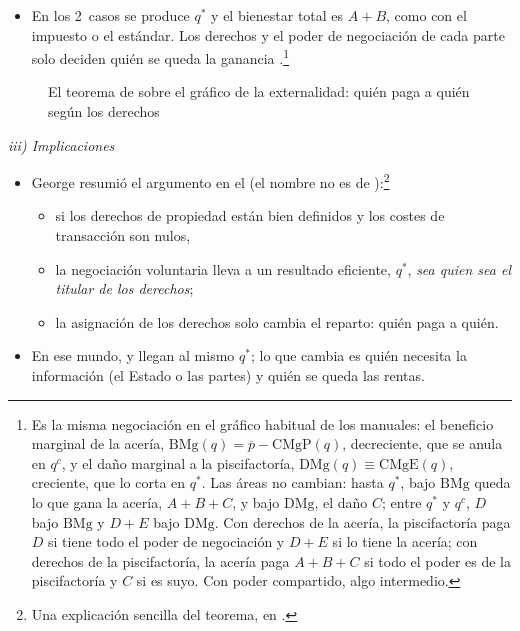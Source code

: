 \documentclass[11pt]{article}
\begin{document}
\begin{itemize}
  \begin{itemize}
  \item la acería gana $A+B+C$ y causa un daño $C$;
  \item el pago está entre $C$, lo mínimo que acepta la piscifactoría, y $A+B+C$, lo máximo que paga la acería.
  \end{itemize}
\item En los 2~casos se produce $q^*$ y el bienestar total es $A+B$, como con el impuesto o el estándar. Los derechos y el poder de negociación de cada parte solo deciden quién se queda la ganancia .\footnote{Es la misma negociación en el gráfico habitual de los manuales: el beneficio marginal de la acería, $\mathrm{BMg}(q)=\overline{p}-\mathrm{CMgP}(q)$, decreciente, que se anula en $q^c$, y el daño marginal a la piscifactoría, $\mathrm{DMg}(q)\equiv\mathrm{CMgE}(q)$, creciente, que lo corta en $q^*$. Las áreas no cambian: hasta $q^*$, bajo $\mathrm{BMg}$ queda lo que gana la acería, $A+B+C$, y bajo $\mathrm{DMg}$, el daño $C$; entre $q^*$ y $q^c$, $D$ bajo $\mathrm{BMg}$ y $D+E$ bajo $\mathrm{DMg}$. Con derechos de la acería, la piscifactoría paga $D$ si tiene todo el poder de negociación y $D+E$ si lo tiene la acería; con derechos de la piscifactoría, la acería paga $A+B+C$ si todo el poder es de la piscifactoría y $C$ si es suyo. Con poder compartido, algo intermedio.}
\end{itemize}

\begin{figure}[H]
\centering
\caption{El teorema de  sobre el gráfico de la externalidad: quién paga a quién según los derechos}\label{fig:coase-externalidad}
\end{figure}

\hspace*{3.6em}\emph{iii) Implicaciones}

\begin{itemize}
\item George \textcite[113]{Stigler1966Theory} resumió el argumento en el  (el nombre no es de ):\footnote{Una explicación sencilla del teorema, en \textcite{SalaiMartin2013Coase}.}
  \begin{itemize}
  \item si los derechos de propiedad están bien definidos y los costes de transacción son nulos,
  \item la negociación voluntaria lleva a un resultado eficiente, $q^*$, \emph{sea quien sea el titular de los derechos};
  \item la asignación de los derechos solo cambia el reparto: quién paga a quién.
  \end{itemize}
\item En ese mundo,  y  llegan al mismo $q^*$; lo que cambia es quién necesita la información (el Estado o las partes) y quién se queda las rentas.
\end{itemize}
\end{document}

